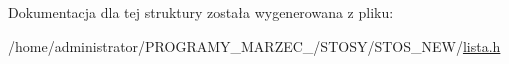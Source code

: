 Dokumentacja dla tej struktury została wygenerowana z pliku\+:\begin{DoxyCompactItemize}
\item 
/home/administrator/\+P\+R\+O\+G\+R\+A\+M\+Y\+\_\+\+M\+A\+R\+Z\+E\+C\+\_/\+S\+T\+O\+S\+Y/\+S\+T\+O\+S\+\_\+\+N\+E\+W/\hyperlink{lista_8h}{lista.\+h}\end{DoxyCompactItemize}
